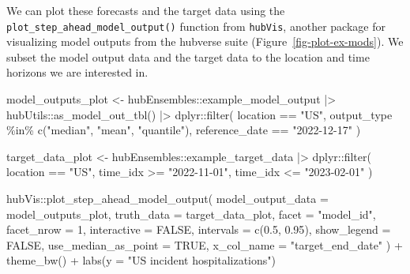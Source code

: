 \documentclass[
]{article}
\newenvironment{Shaded}{\begin{snugshade}}{\end{snugshade}}
\newcommand{\AttributeTok}[1]{\textcolor[rgb]{0.40,0.45,0.13}{#1}}
\newcommand{\ConstantTok}[1]{\textcolor[rgb]{0.56,0.35,0.01}{#1}}
\newcommand{\DecValTok}[1]{\textcolor[rgb]{0.68,0.00,0.00}{#1}}
\newcommand{\FloatTok}[1]{\textcolor[rgb]{0.68,0.00,0.00}{#1}}
\newcommand{\FunctionTok}[1]{\textcolor[rgb]{0.28,0.35,0.67}{#1}}
\newcommand{\NormalTok}[1]{\textcolor[rgb]{0.00,0.23,0.31}{#1}}
\newcommand{\OtherTok}[1]{\textcolor[rgb]{0.00,0.23,0.31}{#1}}
\newcommand{\SpecialCharTok}[1]{\textcolor[rgb]{0.37,0.37,0.37}{#1}}
\newcommand{\StringTok}[1]{\textcolor[rgb]{0.13,0.47,0.30}{#1}}
\begin{document}
We can plot these forecasts and the target data using the
\texttt{plot\_step\_ahead\_model\_output()} function from
\texttt{hubVis}, another package for visualizing model outputs from the
hubverse suite (Figure~\ref{fig-plot-ex-mods}). We subset the model
output data and the target data to the location and time horizons we are
interested in.

\begin{Shaded}
\begin{Highlighting}[]
\NormalTok{model\_outputs\_plot }\OtherTok{\textless{}{-}}\NormalTok{ hubEnsembles}\SpecialCharTok{::}\NormalTok{example\_model\_output }\SpecialCharTok{|\textgreater{}}
\NormalTok{  hubUtils}\SpecialCharTok{::}\FunctionTok{as\_model\_out\_tbl}\NormalTok{() }\SpecialCharTok{|\textgreater{}}
\NormalTok{  dplyr}\SpecialCharTok{::}\FunctionTok{filter}\NormalTok{(}
\NormalTok{    location }\SpecialCharTok{==} \StringTok{"US"}\NormalTok{,}
\NormalTok{    output\_type }\SpecialCharTok{\%in\%} \FunctionTok{c}\NormalTok{(}\StringTok{"median"}\NormalTok{, }\StringTok{"mean"}\NormalTok{, }\StringTok{"quantile"}\NormalTok{),}
\NormalTok{    reference\_date }\SpecialCharTok{==} \StringTok{"2022{-}12{-}17"}
\NormalTok{  )}

\NormalTok{target\_data\_plot }\OtherTok{\textless{}{-}}\NormalTok{ hubEnsembles}\SpecialCharTok{::}\NormalTok{example\_target\_data }\SpecialCharTok{|\textgreater{}}
\NormalTok{  dplyr}\SpecialCharTok{::}\FunctionTok{filter}\NormalTok{(}
\NormalTok{    location }\SpecialCharTok{==} \StringTok{"US"}\NormalTok{,}
\NormalTok{    time\_idx }\SpecialCharTok{\textgreater{}=} \StringTok{"2022{-}11{-}01"}\NormalTok{,}
\NormalTok{    time\_idx }\SpecialCharTok{\textless{}=} \StringTok{"2023{-}02{-}01"}
\NormalTok{  )}

\NormalTok{hubVis}\SpecialCharTok{::}\FunctionTok{plot\_step\_ahead\_model\_output}\NormalTok{(}
  \AttributeTok{model\_output\_data =}\NormalTok{ model\_outputs\_plot,}
  \AttributeTok{truth\_data =}\NormalTok{ target\_data\_plot,}
  \AttributeTok{facet =} \StringTok{"model\_id"}\NormalTok{,}
  \AttributeTok{facet\_nrow =} \DecValTok{1}\NormalTok{,}
  \AttributeTok{interactive =} \ConstantTok{FALSE}\NormalTok{,}
  \AttributeTok{intervals =} \FunctionTok{c}\NormalTok{(}\FloatTok{0.5}\NormalTok{, }\FloatTok{0.95}\NormalTok{),}
  \AttributeTok{show\_legend =} \ConstantTok{FALSE}\NormalTok{,}
  \AttributeTok{use\_median\_as\_point =} \ConstantTok{TRUE}\NormalTok{,}
  \AttributeTok{x\_col\_name =} \StringTok{"target\_end\_date"}
\NormalTok{) }\SpecialCharTok{+}
  \FunctionTok{theme\_bw}\NormalTok{() }\SpecialCharTok{+}
  \FunctionTok{labs}\NormalTok{(}\AttributeTok{y =} \StringTok{"US incident hospitalizations"}\NormalTok{)}
\end{Highlighting}
\end{Shaded}
\end{document}
